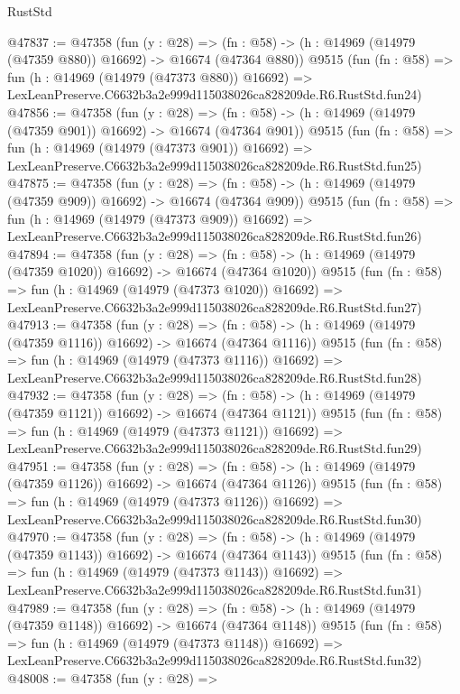 \begin{lexlean}{RustStd}
\begin{coremodule}
@47837 := @47358
    (fun (y : @28) =>
    (fn : @58) -> (h : @14969 (@14979 (@47359 @880)) @16692) -> @16674 (@47364 @880))
    @9515
    (fun (fn : @58) =>
    fun (h : @14969 (@14979 (@47373 @880)) @16692) =>
    LexLeanPreserve.C6632b3a2e999d115038026ca828209de.R6.RustStd.fun24)
@47856 := @47358
    (fun (y : @28) =>
    (fn : @58) -> (h : @14969 (@14979 (@47359 @901)) @16692) -> @16674 (@47364 @901))
    @9515
    (fun (fn : @58) =>
    fun (h : @14969 (@14979 (@47373 @901)) @16692) =>
    LexLeanPreserve.C6632b3a2e999d115038026ca828209de.R6.RustStd.fun25)
@47875 := @47358
    (fun (y : @28) =>
    (fn : @58) -> (h : @14969 (@14979 (@47359 @909)) @16692) -> @16674 (@47364 @909))
    @9515
    (fun (fn : @58) =>
    fun (h : @14969 (@14979 (@47373 @909)) @16692) =>
    LexLeanPreserve.C6632b3a2e999d115038026ca828209de.R6.RustStd.fun26)
@47894 := @47358
    (fun (y : @28) =>
    (fn : @58) -> (h : @14969 (@14979 (@47359 @1020)) @16692) -> @16674 (@47364 @1020))
    @9515
    (fun (fn : @58) =>
    fun (h : @14969 (@14979 (@47373 @1020)) @16692) =>
    LexLeanPreserve.C6632b3a2e999d115038026ca828209de.R6.RustStd.fun27)
@47913 := @47358
    (fun (y : @28) =>
    (fn : @58) -> (h : @14969 (@14979 (@47359 @1116)) @16692) -> @16674 (@47364 @1116))
    @9515
    (fun (fn : @58) =>
    fun (h : @14969 (@14979 (@47373 @1116)) @16692) =>
    LexLeanPreserve.C6632b3a2e999d115038026ca828209de.R6.RustStd.fun28)
@47932 := @47358
    (fun (y : @28) =>
    (fn : @58) -> (h : @14969 (@14979 (@47359 @1121)) @16692) -> @16674 (@47364 @1121))
    @9515
    (fun (fn : @58) =>
    fun (h : @14969 (@14979 (@47373 @1121)) @16692) =>
    LexLeanPreserve.C6632b3a2e999d115038026ca828209de.R6.RustStd.fun29)
@47951 := @47358
    (fun (y : @28) =>
    (fn : @58) -> (h : @14969 (@14979 (@47359 @1126)) @16692) -> @16674 (@47364 @1126))
    @9515
    (fun (fn : @58) =>
    fun (h : @14969 (@14979 (@47373 @1126)) @16692) =>
    LexLeanPreserve.C6632b3a2e999d115038026ca828209de.R6.RustStd.fun30)
@47970 := @47358
    (fun (y : @28) =>
    (fn : @58) -> (h : @14969 (@14979 (@47359 @1143)) @16692) -> @16674 (@47364 @1143))
    @9515
    (fun (fn : @58) =>
    fun (h : @14969 (@14979 (@47373 @1143)) @16692) =>
    LexLeanPreserve.C6632b3a2e999d115038026ca828209de.R6.RustStd.fun31)
@47989 := @47358
    (fun (y : @28) =>
    (fn : @58) -> (h : @14969 (@14979 (@47359 @1148)) @16692) -> @16674 (@47364 @1148))
    @9515
    (fun (fn : @58) =>
    fun (h : @14969 (@14979 (@47373 @1148)) @16692) =>
    LexLeanPreserve.C6632b3a2e999d115038026ca828209de.R6.RustStd.fun32)
@48008 := @47358
    (fun (y : @28) =>

\end{coremodule}
\end{lexlean}
